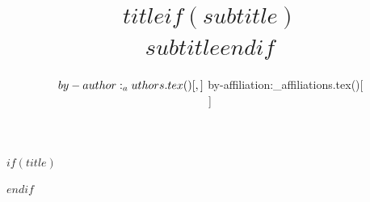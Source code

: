 $if(title)$
\title{$title$$if(subtitle)$\\\vspace{\baselineskip}\large\uppercase{$subtitle$}\vspace{\baselineskip}$endif$}
$endif$
\author{${  by-author:_authors.tex()[, ] }\vspace{\baselineskip}\\\\ ${  by-affiliation:_affiliations.tex()[\\ ] }}
\date{ }